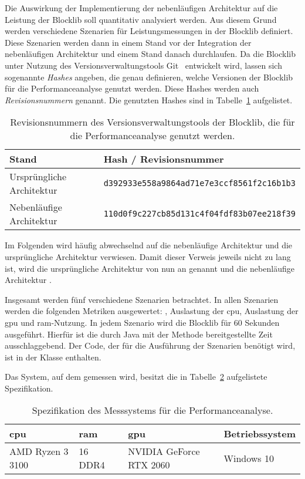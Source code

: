Die Auswirkung der Implementierung der nebenläufigen Architektur auf die Leistung der Blocklib soll quantitativ analysiert werden. Aus diesem Grund werden verschiedene Szenarien für Leistungsmessungen in der Blocklib definiert. Diese Szenarien werden dann in einem Stand vor der Integration der nebenläufigen Architektur und einem Stand danach durchlaufen. Da die Blocklib unter Nutzung des Versionsverwaltungstools Git~\cite{Chacon2014} entwickelt wird, lassen sich sogenannte \emph{Hashes} angeben, die genau definieren, welche Versionen der Blocklib für die Performanceanalyse genutzt werden. Diese Hashes werden auch \emph{Revisionsnummern} genannt. Die genutzten Hashes sind in Tabelle~\ref{tab:perfHash} aufgelistet.

\begin{table}[!htbp]
	\centering
	\begin{tabular}{ll}
		\toprule
		Stand & Hash / Revisionsnummer \\
		\midrule
		Ursprüngliche Architektur & \texttt{d392933e558a9864ad71e7e3ccf8561f2c16b1b3} \\
		Nebenläufige Architektur & \texttt{110d0f9c227cb85d131c4f04fdf83b07ee218f39}\\
		\bottomrule
	\end{tabular}
	\caption{Revisionsnummern des Versionsverwaltungstools der Blocklib, die für die Performanceanalyse genutzt werden.}\label{tab:perfHash}
\end{table}

Im Folgenden wird häufig abwechselnd auf die nebenläufige Architektur und die ursprüngliche Architektur verwiesen. Damit dieser Verweis jeweils nicht zu lang ist, wird die ursprüngliche Architektur von nun an \emph{\sysA{}} genannt und die nebenläufige Architektur \emph{\sysB{}}.

Insgesamt werden fünf verschiedene Szenarien betrachtet. In allen Szenarien werden die folgenden Metriken ausgewertet: \si{\fps}, Auslastung der \acs{cpu}, Auslastung der \ac{gpu} und \ac{ram}-Nutzung. In jedem Szenario wird die Blocklib für 60 Sekunden ausgeführt. Hierfür ist die durch Java mit der Methode  bereitgestellte Zeit ausschlaggebend. Der Code, der für die Ausführung der Szenarien benötigt wird, ist in der Klasse \classThreadingProgram{} enthalten.

Das System, auf dem gemessen wird, besitzt die in Tabelle~\ref{tab:spec} aufgelistete Spezifikation.

\begin{table}[!h]
	\centering
	\begin{tabular}[]{llll}
		\ac{cpu} & \ac{ram} & \ac{gpu} & Betriebssystem\\
		\midrule
		AMD Ryzen 3 3100 & \SI{16}{\giga\byte} DDR4 & NVIDIA GeForce RTX 2060 & Windows 10
	\end{tabular}
	\caption{Spezifikation des Messsystems für die Performanceanalyse.}\label{tab:spec}
\end{table}

